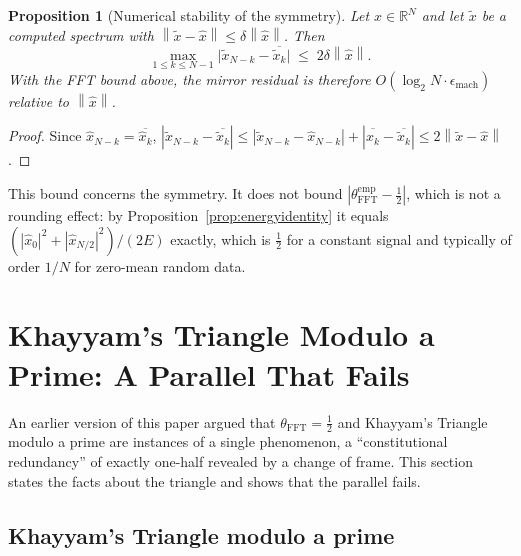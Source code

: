 \documentclass[12pt]{article}
\newtheorem{proposition}[theorem]{Proposition}
\theoremstyle{definition}
\newcommand{\R}{\mathbb{R}}
\newcommand{\norm}[1]{\left\|#1\right\|}
\newcommand{\abs}[1]{\left|#1\right|}
\newcommand{\thetaFFT}{\theta_{\mathrm{FFT}}}
\begin{document}
\begin{proposition}[Numerical stability of the symmetry]\label{prop:numerical}
Let $x \in \R^N$ and let $\tilde{x}$ be a computed spectrum with
$\norm{\tilde{x} - \hat{x}} \leq \delta \norm{\hat{x}}$.  Then
\[
  \max_{1 \leq k \leq N-1}
  \bigl|\tilde{x}_{N-k} - \overline{\tilde{x}_k}\bigr|
  \;\leq\; 2\delta \norm{\hat{x}}.
\]
With the FFT bound above, the mirror residual is therefore
$O(\log_2 N \cdot \epsilon_{\mathrm{mach}})$ relative to $\norm{\hat{x}}$.
\end{proposition}

\begin{proof}
Since $\hat{x}_{N-k} = \overline{\hat{x}_k}$,
$\abs{\tilde{x}_{N-k} - \overline{\tilde{x}_k}}
\leq \abs{\tilde{x}_{N-k} - \hat{x}_{N-k}} + \abs{\overline{\hat{x}_k} - \overline{\tilde{x}_k}}
\leq 2\norm{\tilde{x} - \hat{x}}$.
\end{proof}

This bound concerns the symmetry.  It does not bound
$\abs{\thetaFFT^{\mathrm{emp}} - \tfrac{1}{2}}$, which is not a rounding
effect: by Proposition~\ref{prop:energyidentity} it equals
$(\abs{\hat{x}_0}^2 + \abs{\hat{x}_{N/2}}^2)/(2E)$ exactly, which is
$\tfrac{1}{2}$ for a constant signal and typically of order $1/N$ for
zero-mean random data.

\section{Khayyam's Triangle Modulo a Prime: A Parallel That Fails}
\label{sec:bridge}

An earlier version of this paper argued that $\thetaFFT = \tfrac{1}{2}$
and Khayyam's Triangle modulo a prime are instances of a single
phenomenon, a ``constitutional redundancy'' of exactly one-half revealed
by a change of frame.  This section states the facts about the triangle
and shows that the parallel fails.

\subsection{Khayyam's Triangle modulo a prime}
\end{document}
